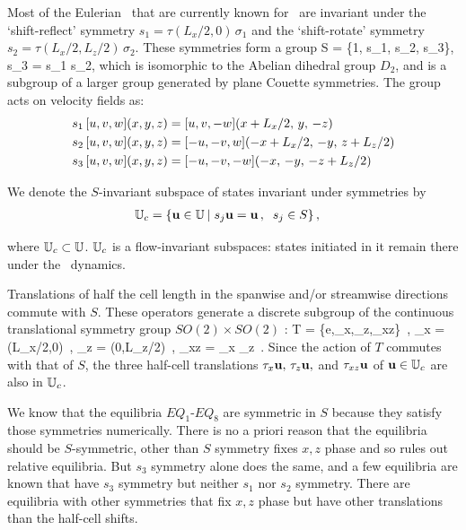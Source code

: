 \documentclass[letter,12pt,openany]{article}
\begin{document}
Most of the Eulerian \eqva\ that are currently known for \pCf\
are invariant under the `shift-reflect' symmetry
$s_1 = \tau(L_x/2,0) \, \sigma_1$ and the `shift-rotate' symmetry
$s_2 = \tau(L_x/2,L_z/2) \, \sigma_2$.  These symmetries form a group
\beq
S = \{1, s_1, s_2, s_3\}, \qquad s_3 = s_1 s_2, 
\eeq
which is isomorphic to the Abelian dihedral group $D_2$, and is a 
subgroup of a larger group generated by plane Couette symmetries. The 
group acts on velocity fields as: 
\begin{align}
s_1 \, [u, v, w](x,y,z) &= [u, v, -w](x+L_x/2,\, y,\, -z) \nonumber \\ 
s_2 \, [u, v, w](x,y,z) &= [-u, -v, w](-x+L_x/2,\,-y,\,z+L_z/2) \label{shiftRot} \\
s_3 \, [u, v, w](x,y,z) &= [-u,-v,-w](-x,\, -y,\, -z+L_z/2)  \nonumber 
\,
\end{align}

We denote the $S$-invariant subspace of states invariant under
symmetries  by
\begin{align}
\mathbb{U}_{c}  &= \{{\bf u} \in \mathbb{U}  \: | \;
              s_j {\bf u} = {\bf u}\,, \;\;  s_j \in S \}
\,,
\label{symmSubspU}
\end{align}

where $ \mathbb{U}_{c} \subset \mathbb{U}$.
%
$\mathbb{U}_{c}$ is a flow-invariant subspaces: states initiated
in it remain there under the \NS\ dynamics.


Translations of half the cell length in the spanwise and/or streamwise
directions commute with $S$. These operators generate a discrete
subgroup of the continuous translational symmetry group $SO(2) \times
SO(2)$ :
\beq
T = \{e,\tau_x,\tau_z,\tau_{xz}\}
    \,,\qquad
    \tau_x = \tau(L_x/2,0)
    \,,\;
    \tau_z = \tau(0,L_z/2)
    \,,\;
    \tau_{xz} = \tau_x \tau_z
\,.
Since the action of $T$ commutes with that of $S$,
the three half-cell translations $\tau_x {\bf u}, \, \tau_z {\bf u},$ and
$\tau_{xz} {\bf u}$ of ${\bf u} \in \mathbb{U}_{c}$ are also in $\mathbb{U}_{c}$.

We know that the equilibria  $EQ_1$-$EQ_8$ are symmetric in $S$ because 
they satisfy those symmetries numerically. There is no a priori reason 
that the equilibria should be $S$-symmetric, other than $S$ symmetry 
fixes $x,z$ phase and so rules out relative equilibria. But $s_3$ 
symmetry alone does the same, and a few equilibria are known that have 
$s_3$ symmetry but neither $s_1$ nor $s_2$ symmetry. There are equilibria 
with other symmetries that fix $x,z$ phase but have other translations 
than the half-cell shifts. 
\end{document}
